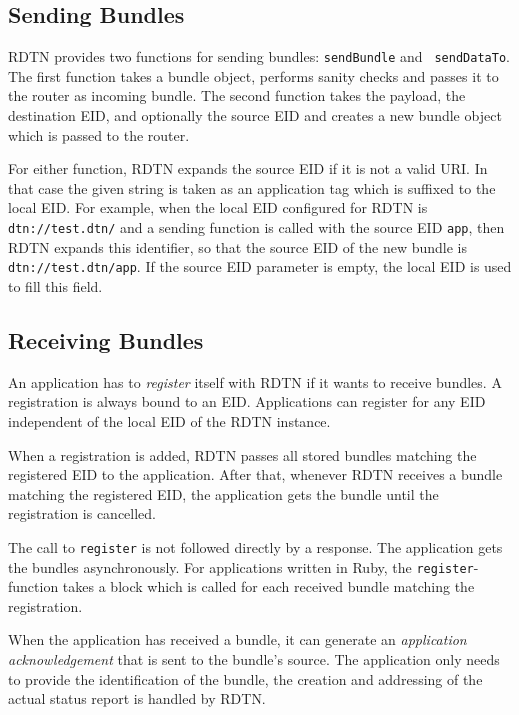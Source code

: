 \documentclass[a4paper]{article}
\begin{document}
\subsection{Sending Bundles}\label{sec.sending}

RDTN provides two functions for sending bundles: {\tt sendBundle} and {\tt
sendDataTo}. The first function takes a bundle object, performs sanity checks
and passes it to the router as incoming bundle. The second function takes the
payload, the destination EID, and optionally the source EID and creates a new
bundle object which is passed to the router.

For either function, RDTN expands the source EID if it is not a valid URI. In
that case the given string is taken as an application tag which is suffixed to
the local EID. For example, when the local EID configured for RDTN is {\tt
dtn://test.dtn/} and a sending function is called with the source EID {\tt app},
then RDTN expands this identifier, so that the source EID of the new bundle is
{\tt dtn://test.dtn/app}. If the source EID parameter is empty, the local EID is
used to fill this field.

\subsection{Receiving Bundles}\label{sec.receiving}

An application has to {\em register} itself with RDTN if it wants to receive
bundles. A registration is always bound to an
EID.  Applications can register for any EID independent of the local EID of the
RDTN instance.

When a registration is added, RDTN passes all stored bundles matching the
registered EID to the application. After that, whenever RDTN receives a bundle 
matching the registered EID, the application gets the bundle until the 
registration is cancelled.

The call to {\tt register} is not followed directly by a response. The
application gets the bundles asynchronously. For applications written in Ruby,
the {\tt register}-function takes a block which is called for each received
bundle matching the registration.

When the application has received a bundle, it can generate an {\em application
acknowledgement} that is sent to the bundle's source. The application only needs
to provide the identification of the bundle, the creation and addressing of the
actual status report is handled by RDTN.
\end{document}
